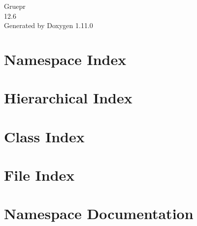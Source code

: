 \documentclass[twoside]{book}
\newcommand{\+}{\discretionary{\mbox{\scriptsize$\hookleftarrow$}}{}{}}
\newcommand{\clearemptydoublepage}{%
    \newpage{\pagestyle{empty}\cleardoublepage}%
  }
\begin{document}
  \raggedbottom
    \hypersetup{pageanchor=false,
                bookmarksnumbered=true,
                pdfencoding=unicode
               }
  \begin{titlepage}
  \vspace*{7cm}
  \begin{center}%
  {\Large Gruepr}\\
  [1ex]\large 12.\+6 \\
  \vspace*{1cm}
  {\large Generated by Doxygen 1.11.0}\\
  \end{center}
  \end{titlepage}
  \clearemptydoublepage
  \tableofcontents
  \clearemptydoublepage
  \hypersetup{pageanchor=true}

\chapter{Namespace Index}

\chapter{Hierarchical Index}

\chapter{Class Index}

\chapter{File Index}

\chapter{Namespace Documentation}




\end{document}
